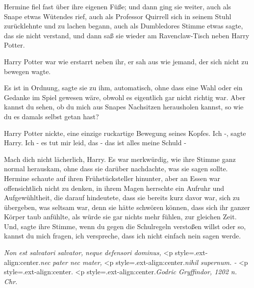 Hermine fiel fast über ihre eigenen Füße; und dann ging sie weiter, auch als
Snape etwas Wütendes rief, auch als Professor Quirrell sich in seinem Stuhl
zurücklehnte und zu lachen begann, auch als Dumbledores Stimme etwas sagte, das
sie nicht verstand, und dann saß sie wieder am Ravenclaw-Tisch neben Harry
Potter.

Harry Potter war wie erstarrt neben ihr, er sah aus wie jemand, der sich nicht
zu bewegen wagte.

\glqq{}Es ist in Ordnung\grqq{}, sagte sie zu ihm, automatisch, ohne dass eine
Wahl oder ein Gedanke im Spiel gewesen wäre, obwohl es eigentlich gar nicht
richtig war. \glqq{}Aber kannst du sehen, ob du mich aus Snapes Nachsitzen
herausholen kannst, so wie du es damals selbst getan hast?\grqq{}

Harry Potter nickte, eine einzige ruckartige Bewegung seines Kopfes. \glqq{}Ich
-\grqq{}, sagte Harry. \glqq{}Ich - es tut mir leid, das - das ist alles meine
Schuld -\grqq{}

\glqq{}Mach dich nicht lächerlich, Harry.\grqq{} Es war merkwürdig, wie ihre
Stimme ganz normal herauskam, ohne dass sie darüber nachdachte, was sie sagen
sollte. Hermine schaute auf ihren Frühstücksteller hinunter, aber an Essen war
offensichtlich nicht zu denken, in ihrem Magen herrschte ein Aufruhr und
Aufgewühltheit, die darauf hindeutete, dass sie bereits kurz davor war, sich zu
übergeben, was seltsam war, denn sie hätte schwören können, dass sich ihr ganzer
Körper taub anfühlte, als würde sie gar nichts mehr fühlen, zur gleichen Zeit.
\glqq{}Und\grqq{}, sagte ihre Stimme, \glqq{}wenn du gegen die Schulregeln
verstoßen willst oder so, kannst du mich fragen, ich verspreche, dass ich nicht
einfach nein sagen werde.\grqq{}

\emph{Non est salvatori salvator,}
\emph{neque defensori dominus,}   <p
style=\grqq{}.ext-align:center\grqq{}.\emph{nec pater nec mater,}   <p
style=\grqq{}.ext-align:center\grqq{}.\emph{nihil supernum. -}   <p
style=\grqq{}.ext-align:center\grqq{}.  <p
style=\grqq{}.ext-align:center\grqq{}.\emph{Godric Gryffindor, 1202 n. Chr.
}

